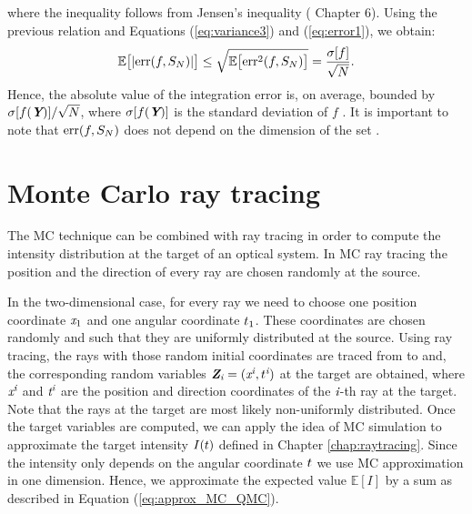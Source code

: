 where the inequality follows from Jensen's inequality (\cite{williams1991probability} Chapter $6$).
Using the previous relation and Equations (\ref{eq:variance3}) and (\ref{eq:error1}), we obtain:
\begin{equation}\label{eq:mean_error}
\mathbb{E}\big[|\textrm{err}(f, S_{N})|\big]\leq
\sqrt{\mathbb{E}\big[\textrm{err}^2(f, S_{N})\big]} = \frac{\sigma[f]}{\sqrt{N}}.
\end{equation}
Hence, the absolute value of the integration error is, on average, bounded by $\sigma[f(\textit{\textbf{Y}})]/\sqrt{N}$, where $\sigma[f(\textit{\textbf{Y}})]$ is the standard deviation of $f$ \cite{leobacher2014introduction}. It is important to note that $\textrm{err}(f, S_{N})$ does not depend on the dimension of the set .
\section{Monte Carlo ray tracing}\label{app:MCRT}
The MC technique can be combined with ray tracing in order to compute the intensity distribution at the target of an optical system.
In MC ray tracing the position and the direction of every ray are chosen randomly at the source. 

In the two-dimensional case, for every ray we need to choose one position coordinate $\textit{x}_1$ and one angular coordinate $t_1$. These coordinates are chosen randomly and such that they are uniformly distributed at the source. 
Using ray tracing, the rays with those random initial coordinates are traced from  to  and, the corresponding random variables $\textit{\textbf{Z}}_{\textit{i}}=(\textit{x}^{\textit{i}},t^{\textit{i}})$ at the target are obtained, where $\textit{x}^{\textit{i}}$ and $\textit{t}^{\textit{i}}$ are the position and direction coordinates of the $\textit{i}$-th ray at the target. Note that the rays at the target are most likely non-uniformly distributed. Once the target variables are computed, we can apply the idea of MC simulation to approximate the target intensity $I(t)$ defined in Chapter \ref{chap:raytracing}. Since the intensity only depends on the angular coordinate $t$ we use MC approximation in one dimension. Hence, we approximate the expected value $\mathbb{E}[I]$ by a sum as described in Equation (\ref{eq:approx_MC_QMC}). 

